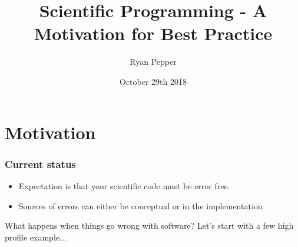 \documentclass{beamer}
\title[Modern Software Development Practices]{Scientific Programming - A Motivation for Best Practice} %
\author{Ryan Pepper} %
\institute[University of Southampton] %
{
University of Southampton \\ %
\medskip
\textit{ryan.pepper@soton.ac.uk} %
}
\date{October 29th 2018} %
\begin{document}
\begin{frame}
\titlepage %
\end{frame}



\section{Motivation} %

\begin{frame}
\frametitle{Current status}
\begin{itemize}
\item Expectation is that your scientific code must be error free.
\item Sources of errors can either be conceptual or in the implementation
\end{itemize}
\centering

What happens when things go wrong with software?
Let's start with a few high profile example...
\end{frame}
\end{document}
